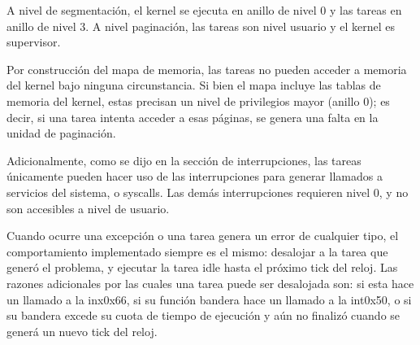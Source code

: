 	A nivel de segmentación, el kernel se ejecuta en anillo de nivel 0 y las tareas 
en anillo de nivel 3. A nivel paginación, las tareas son nivel usuario y el kernel es supervisor.

	Por construcción del mapa de memoria, las tareas no pueden acceder a memoria del 
kernel bajo ninguna circunstancia. Si bien el mapa incluye las tablas de memoria
del kernel, estas precisan un nivel de privilegios mayor (anillo 0); es decir, si una tarea intenta
acceder a esas páginas, se genera una falta en la unidad de paginación.

	Adicionalmente, como se dijo en la sección de interrupciones, las tareas únicamente pueden 
hacer uso de las interrupciones para generar llamados a servicios del sistema, o syscalls. Las 
demás interrupciones requieren nivel 0, y no son accesibles a nivel de usuario.

	Cuando ocurre una excepción o una tarea genera un error de cualquier tipo, el comportamiento 
implementado siempre es el mismo: desalojar a la tarea que generó el problema, y ejecutar la tarea 
idle hasta el próximo tick del reloj. Las razones adicionales por las cuales una tarea puede ser 
desalojada son: si esta hace un llamado a la inx0x66, si su función bandera hace un llamado a la int0x50, 
o si su bandera excede su cuota de tiempo de ejecución y aún no finalizó cuando se generá un nuevo tick del reloj.
